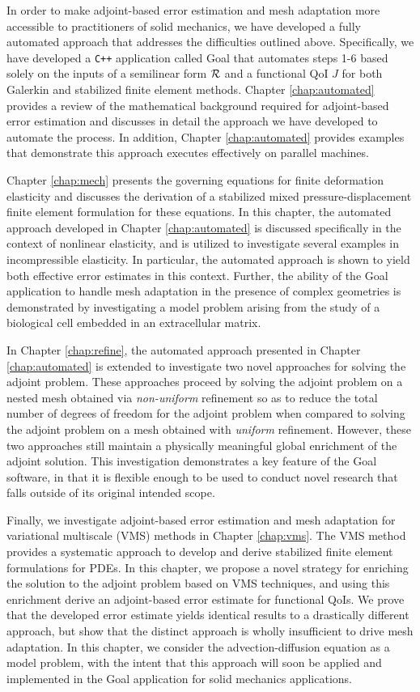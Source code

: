 In order to make adjoint-based error estimation and mesh adaptation
more accessible to practitioners of solid mechanics, we have developed
a fully automated approach that addresses the difficulties outlined
above. Specifically, we have developed a \texttt{C++} application called
Goal that automates steps 1-6 based solely on the inputs of a
semilinear form $\mathcal{R}$ and a functional QoI $J$ for both Galerkin and
stabilized finite element methods. Chapter \ref{chap:automated}
provides a review of the mathematical background required for
adjoint-based error estimation and discusses in detail the approach
we have developed to automate the process. In addition, Chapter
\ref{chap:automated} provides examples that demonstrate this approach
executes effectively on parallel machines.

Chapter \ref{chap:mech} presents the governing equations for
finite deformation elasticity and discusses the derivation
of a stabilized mixed pressure-displacement finite element
formulation for these equations. In this chapter, the automated
approach developed in Chapter \ref{chap:automated} is discussed
specifically in the context of nonlinear elasticity, and is utilized
to investigate several examples in incompressible elasticity.
In particular, the automated approach is shown to yield both
effective error estimates in this context. Further, the ability of the
Goal application to handle mesh adaptation in the presence of complex
geometries is demonstrated by investigating a model problem arising
from the study of a biological cell embedded in an extracellular
matrix.

In Chapter \ref{chap:refine}, the automated approach presented in
Chapter \ref{chap:automated} is extended to investigate two
novel approaches for solving the adjoint problem.
These approaches proceed by solving the adjoint problem on a
nested mesh obtained via \emph{non-uniform} refinement so as to
reduce the total number of degrees of freedom for the adjoint problem
when compared to solving the adjoint problem on a mesh obtained
with \emph{uniform} refinement. However, these two approaches still
maintain a physically meaningful global enrichment of the adjoint
solution. This investigation demonstrates a key feature of the Goal
software, in that it is flexible enough to be used to conduct novel
research that falls outside of its original intended scope.

Finally, we investigate adjoint-based error estimation and mesh
adaptation for variational multiscale (VMS) methods in Chapter \ref{chap:vms}.
The VMS method provides a systematic approach to develop and derive
stabilized finite element formulations for PDEs. In this chapter,
we propose a novel strategy for enriching the solution to the
adjoint problem based on VMS techniques, and using this enrichment
derive an adjoint-based error estimate for functional QoIs.
We prove that the developed error estimate yields identical
results to a drastically different approach, but show that the
distinct approach is wholly insufficient to drive mesh adaptation.
In this chapter, we consider the advection-diffusion equation as a
model problem, with the intent that this approach will soon
be applied and implemented in the Goal application for
solid mechanics applications.

